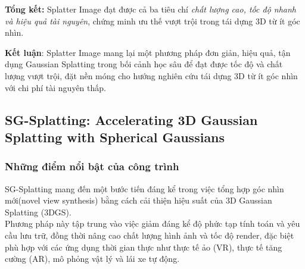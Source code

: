 \textbf{Tổng kết:} Splatter Image đạt được cả ba tiêu chí \textit{chất lượng cao, tốc độ nhanh và hiệu quả tài nguyên}, chứng minh ưu thế vượt trội trong tái dựng 3D từ ít góc nhìn.

            
            \textbf{Kết luận}: Splatter Image mang lại một phương pháp đơn giản, hiệu quả, tận dụng Gaussian Splatting trong bối cảnh học sâu để đạt được tốc độ và chất lượng vượt trội, đặt nền móng cho hướng nghiên cứu tái dựng 3D từ ít góc nhìn với chi phí tài nguyên thấp.
\newpage
\subsection{SG-Splatting: Accelerating 3D Gaussian Splatting with Spherical Gaussians \cite{b4}}
\subsubsection{Những điểm nổi bật của công trình}
SG-Splatting mang đến một bước tiến đáng kể trong việc tổng hợp góc nhìn mới(novel view synthesis) bằng cách cải thiện hiệu suất của 3D Gaussian Splatting (3DGS). \\

Phương pháp này tập trung vào việc giảm đáng kể độ phức tạp tính toán và yêu cầu lưu trữ, đồng thời nâng cao chất lượng hình ảnh và tốc độ render, đặc biệt phù hợp với các ứng dụng thời gian thực như thực tế ảo (VR), thực tế tăng cường (AR), mô phỏng vật lý và lái xe tự động. \\

